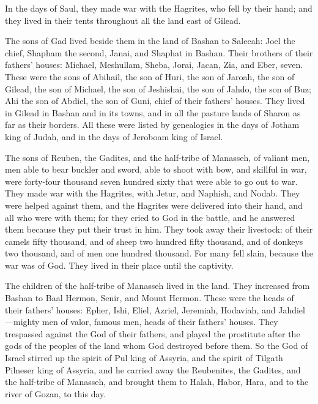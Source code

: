 \myverse{}In the days of Saul, they made war with the Hagrites, who fell
by their hand; and they lived in their tents throughout all the land east of Gilead.

\myverse{}The sons of Gad lived beside them in the land of Bashan to Salecah:
\myverse{}Joel the chief, Shapham the second, Janai, and Shaphat in Bashan.
\myverse{}Their brothers of their fathers’ houses: Michael, Meshullam, Sheba, Jorai,
Jacan, Zia, and Eber, seven.
\myverse{}These were the sons of Abihail, the son of Huri, the son of Jaroah, the son
of Gilead, the son of Michael, the son of Jeshishai, the son of Jahdo, the son of Buz;
\myverse{}Ahi the son of Abdiel, the son of Guni, chief of their fathers’ houses.
\myverse{}They lived in Gilead in Bashan and in its towns, and in all the pasture lands
of Sharon as far as their borders.
\myverse{}All these were listed by genealogies in the days of Jotham king of Judah,
and in the days of Jeroboam king of Israel.

\myverse{}The sons of Reuben, the Gadites, and the half-tribe of Manasseh,
of valiant men, men able to bear buckler and sword, able to shoot with bow, and skillful in war, were
forty-four thousand seven hundred sixty that were able to go out to war.
\myverse{}They made war with the Hagrites, with Jetur, and Naphish, and Nodab.
\myverse{}They were helped against them, and the Hagrites were delivered into their
hand, and all who were with them; for they cried to God in the battle, and he answered them because they
put their trust in him.
\myverse{}They took away their livestock: of their camels fifty thousand, and of sheep
two hundred fifty thousand, and of donkeys two thousand, and of men one hundred thousand.
\myverse{}For many fell slain, because the war was of God. They lived in their place
until the captivity.

\myverse{}The children of the half-tribe of Manasseh lived in the land.
They increased from Bashan to Baal Hermon, Senir, and Mount Hermon.
\myverse{}These were the heads of their fathers’ houses: Epher, Ishi, Eliel, Azriel,
Jeremiah, Hodaviah, and Jahdiel—mighty men of valor, famous men, heads of their fathers’ houses.
\myverse{}They trespassed against the God of their fathers, and played the prostitute
after the gods of the peoples of the land whom God destroyed before them.
\myverse{}So the God of Israel stirred up the spirit of Pul king of Assyria, and the
spirit of Tilgath Pilneser king of Assyria, and he carried away the Reubenites, the Gadites, and the half-tribe
of Manasseh, and brought them to Halah, Habor, Hara, and to the river of Gozan, to this day.


